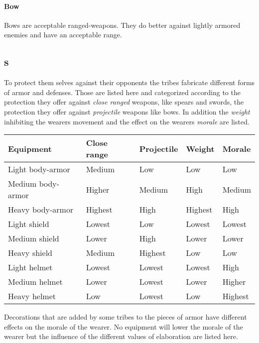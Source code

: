 \paragraph{Bow}

Bows are acceptable ranged-weapons. They do better against lightly armored
enemies and have an acceptable range.

\subsection{s}\label{ch:Goods:Armory:Armor}

To protect them selves against their opponents the tribes fabricate different
forms of armor and defenses. Those are listed here and categorized according to
the protection they offer against \emph{close ranged} weapons, like spears and
swords, the protection they offer against \emph{projectile} weapons like bows.
In addition the \emph{weight} inhibiting the wearers movement and the effect on
the wearers \emph{morale} are listed.

\begin{longtable}{lllll}
	\toprule
	Equipment
	 & Close range & Projectile & Weight  & Morale  \\
	\midrule
	Light body-armor
	 & Medium      & Low        & Low     & Low     \\
	Medium body-armor
	 & Higher      & Medium     & High    & Medium  \\
	Heavy body-armor
	 & Highest     & High       & Highest & High    \\
	\midrule
	Light shield
	 & Lowest      & Low        & Lowest  & Lowest  \\
	Medium shield
	 & Lower       & High       & Lower   & Lower   \\
	Heavy shield
	 & Medium      & Highest    & Low     & Low     \\
	\midrule
	Light helmet
	 & Lowest      & Lowest     & Lowest  & High    \\
	Medium helmet
	 & Lower       & Lowest     & Lower   & Higher  \\
	Heavy helmet
	 & Low         & Lowest     & Low     & Highest \\
	\bottomrule
\end{longtable}

Decorations that are added by some tribes to the pieces of armor have different
effects on the morale of the wearer. No equipment will lower the morale of the
wearer but the influence of the different values of elaboration are listed
here.

